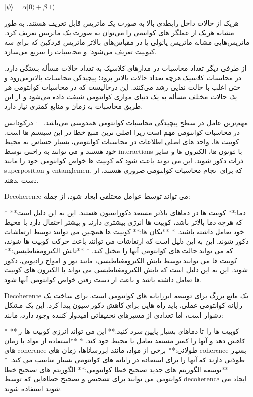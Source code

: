 \documentclass{book}
\begin{document}
\begin{center}
	$\vert\psi\rangle = \alpha\vert0\rangle + \beta\vert1\rangle$
\end{center}

هریک از حالات داخل رابطه‌ی بالا به صورت یک ماتریس قابل تعریف هستند. به طور مشابه هریک از عملگر های کوانتمی را می‌توان به صورت یک ماتریس تعریف کرد. ماتریس‌هایی مشابه ماتریس پائولی یا در مقیاس‌های بالاتر ماتریس فردکین که برای سه کیوبیت تعریف می‌شود؛ و محاسبات را سریع می‌سازد.



از طرفی دیگر تعداد محاسبات در مدار‌های کلاسیک به تعداد حالات مسأله بستگی دارد. در محاسبات کلاسیک هرچه تعداد حالات بالاتر برود؛ پیچیدگی محاسبات بالاتر‌می‌رود و حتی اغلب با حالت نمایی رشد می‌کنند. این درحالیست که در محاسبات کوانتومی هر یک حالات مختلف مسأله به یک دنیای موازی کوانتومی شیفت داده می‌شود و از این طریق محاسبات به زمان و منابع کمتری نیاز دارد.


مهم‌ترین عامل در سطح پیچیدگی محاسبات کوانتومی همدوسی می‌باشد. 
🤖 : درکودانس در محاسبات کوانتومی مهم است زیرا اصلی ترین منبع خطا در این سیستم ها است. کوبیت ها، واحد های اصلی اطلاعات در محاسبات کوانتومی، بسیار حساس به محیط خود هستند و می توانند به راحتی توسط  interactions با فوتون ها، الکترون ها و سایر ذرات دکور شوند. این می تواند باعث شود که کوبیت ها خواص کوانتومی خود را مانند superposition و entanglement که برای انجام محاسبات کوانتومی ضروری هستند، از دست بدهند.

Decoherence می تواند توسط عوامل مختلفی ایجاد شود، از جمله:

* **دما:** کوبیت ها در دماهای بالاتر مستعد دکوراسیون هستند. این به این دلیل است که هرچه دما بالاتر باشد، کوبیت ها انرژی بیشتری دارند و بیشتر احتمال دارد با محیط خود تعامل داشته باشند.
* **تکان ها:** کوبیت ها همچنین می توانند توسط ارتعاشات دکور شوند. این به این دلیل است که ارتعاشات می توانند باعث حرکت کوبیت ها شوند، که می تواند حالت های کوانتومی آنها را مختل کند.
* **تابش الکترومغناطیسی:** کوبیت ها می توانند توسط تابش الکترومغناطیسی، مانند نور و امواج رادیویی، دکور شوند. این به این دلیل است که تابش الکترومغناطیسی می تواند با الکترون های کوبیت ها تعامل داشته باشد و باعث از دست رفتن خواص کوانتومی آنها شود.

Decoherence یک مانع بزرگ برای توسعه ابررایانه های کوانتومی است. برای ساخت یک رایانه کوانتومی عملی، باید راه هایی برای کاهش دکوراسیون پیدا کرد. این یک مشکل دشوار است، اما تعدادی از مسیرهای تحقیقاتی امیدوار کننده وجود دارد، مانند:

* **کوبیت ها را تا دماهای بسیار پایین سرد کنید:** این می تواند انرژی کوبیت ها را کاهش دهد و آنها را کمتر مستعد تعامل با محیط خود کند.
* **استفاده از مواد با زمان های coherence طولانی:** برخی از مواد، مانند ابررساناها، زمان های coherence بسیار طولانی دارند که آنها را برای استفاده در رایانه های کوانتومی بسیار مناسب می کند.
* **توسعه الگوریتم های جدید تصحیح خطا کوانتومی:** الگوریتم های تصحیح خطا کوانتومی می توانند برای تشخیص و تصحیح خطاهایی که توسط decoherence ایجاد می شوند استفاده شوند.
\end{document}
